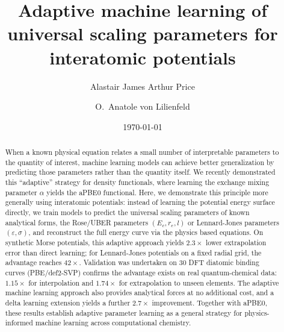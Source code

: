 \documentclass[aps,prb,twocolumn,superscriptaddress,longbibliography,floatfix]{revtex4-2}
\begin{document}
\title{Adaptive machine learning of universal scaling parameters for interatomic potentials}

\author{Alastair James Arthur Price}

\author{O.~Anatole von Lilienfeld}

\date{\today}

\begin{abstract}
When a known physical equation relates a small number of interpretable parameters to the quantity of interest, machine learning models can achieve better generalization by predicting those parameters rather than the quantity itself. We recently demonstrated this ``adaptive'' strategy for density functionals, where learning the exchange mixing parameter $\alpha$ yields the aPBE0 functional. Here, we demonstrate this principle more generally using interatomic potentials: instead of learning the potential energy surface directly, we train models to predict the universal scaling parameters of known analytical forms, the Rose/UBER parameters $(E_c, r_e, l)$ or Lennard-Jones parameters $(\varepsilon, \sigma)$, and reconstruct the full energy curve via the physics based equations. On synthetic Morse potentials, this adaptive approach yields $2.3\times$ lower extrapolation error than direct learning; for Lennard-Jones potentials on a fixed radial grid, the advantage reaches $42\times$. Validation was undertaken on 30 DFT diatomic binding curves (PBE/def2-SVP) confirms the advantage exists on real quantum-chemical data: $1.15\times$ for interpolation and $1.74\times$ for extrapolation to unseen elements. The adaptive machine learning approach also provides analytical forces at no additional cost, and a delta learning extension yields a further $2.7\times$ improvement. Together with aPBE0, these results establish adaptive parameter learning as a general strategy for physics-informed machine learning across computational chemistry.
\end{abstract}

\maketitle
\end{document}
